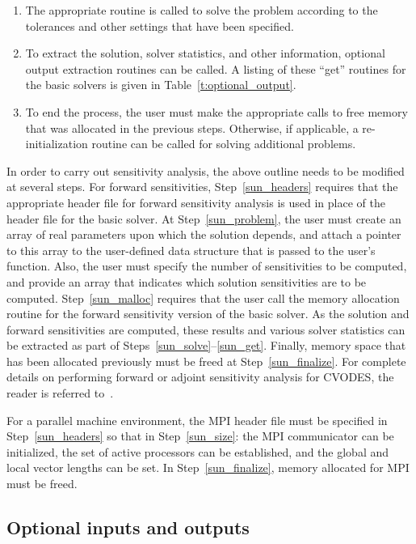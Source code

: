 \begin{enumerate}
\item \label{sun_solve}
The appropriate routine is called to solve the problem according to
the tolerances and other settings that have been specified.

\item \label{sun_get}
To extract the solution, solver statistics, and other information,
optional output extraction routines can be called. A listing of these
``get'' routines for the basic solvers is given 
in Table~\ref{t:optional_output}.

\item \label{sun_finalize}
To end the process, the user must make the appropriate calls to
free memory that was allocated in the previous steps. Otherwise, if
applicable, a re-initialization routine can be called for solving
additional problems.

\end{enumerate}

In order to carry out sensitivity analysis, the above outline
needs to be modified at several steps. For forward sensitivities,
Step~\ref{sun_headers} requires that the appropriate header
file for forward sensitivity analysis is used in place of the header
file for the basic solver. At Step~\ref{sun_problem}, the user must
create an array of real parameters upon which the solution depends,
and attach a pointer to this array to the user-defined data structure
that is passed to the user's function. Also, the user must specify the
number of sensitivities to be computed, and provide an array that
indicates which solution sensitivities are to be
computed. Step~\ref{sun_malloc} requires that the user call the memory
allocation routine for the forward sensitivity version of the basic
solver. As the solution and forward sensitivities are computed,
these results and various solver statistics can be extracted as part
of Steps~\ref{sun_solve}--\ref{sun_get}. Finally, memory space that
has been allocated previously must be freed at
Step~\ref{sun_finalize}. For complete details on performing forward or
adjoint sensitivity analysis for CVODES, the reader is referred to~\cite{SeHi:03}.

For a parallel machine environment, the MPI header file must be
specified in Step~\ref{sun_headers} so that in Step~\ref{sun_size}: the MPI
communicator can be initialized, the set of active processors can be
established, and the global and local vector lengths can be set.
In Step~\ref{sun_finalize}, memory allocated for MPI must be freed.

\subsection{Optional inputs and outputs}\label{ss:optional_io}

